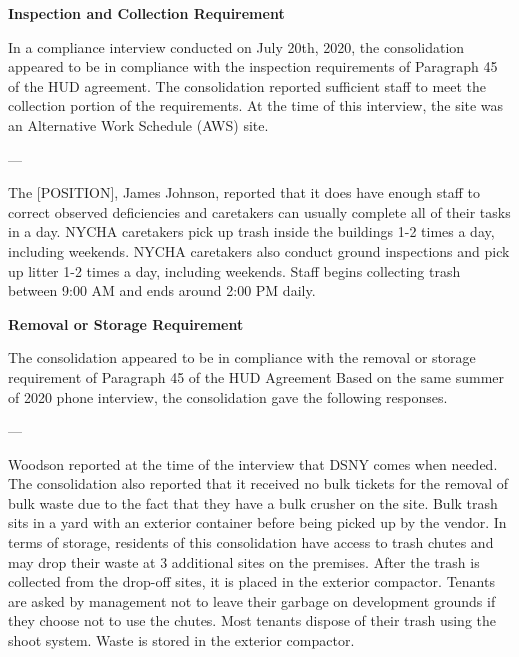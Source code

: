 
\textbf{Inspection and Collection Requirement}

In a compliance interview conducted on July 20th, 2020, the consolidation appeared to be in compliance with the inspection requirements of Paragraph 45 of the HUD agreement. The consolidation reported sufficient staff to meet the collection portion of the requirements. At the time of this interview, the site was an Alternative Work Schedule (AWS) site. 

---

The [POSITION], James Johnson, reported that it does have enough staff to correct observed deficiencies and caretakers can usually complete all of their tasks in a day. NYCHA caretakers pick up trash inside the buildings 1-2 times a day, including weekends. NYCHA caretakers also conduct ground inspections and pick up litter 1-2 times a day, including weekends. Staff begins collecting trash between 9:00 AM and ends around 2:00 PM daily. 

\textbf{Removal or Storage Requirement}

The consolidation appeared to be in compliance with the  removal or storage requirement of Paragraph  45 of the HUD Agreement Based on the same summer of  2020 phone interview, the consolidation gave the following responses.

---

Woodson reported at the time of the interview that DSNY comes when needed. The consolidation also reported that it received no bulk tickets for the removal of bulk waste due to the fact that they have a bulk crusher on the site. Bulk trash sits in a yard with an exterior container before being picked up by the vendor. In terms of storage, residents of this consolidation have access to trash chutes and may drop their waste at 3 additional sites on the premises. After the trash is collected from the drop-off sites, it is placed in the exterior compactor. Tenants are asked by management not to leave their garbage on development grounds if they choose not to use the chutes. Most tenants dispose of their trash using the shoot system. Waste is stored in the exterior compactor. 
